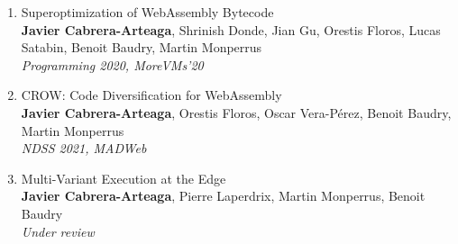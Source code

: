 \begin{enumerate}[label=\subscript{P}{{\arabic*}}]
    \item Superoptimization of WebAssembly Bytecode \cite{WasmSuperoptimizer}\\
    {\small\textbf{Javier Cabrera-Arteaga}, Shrinish Donde, Jian Gu, Orestis Floros, Lucas Satabin, Benoit Baudry, Martin Monperrus}\\
        \emph{Programming 2020, MoreVMs'20}
    \item CROW: Code Diversification for WebAssembly \cite{CROW}\\
    {\small\textbf{Javier Cabrera-Arteaga}, Orestis Floros, Oscar Vera-Pérez, Benoit Baudry, Martin Monperrus}\\
    \emph{NDSS 2021, MADWeb}
    \item Multi-Variant Execution at the Edge \cite{MEWE}\\
    {\small\textbf{Javier Cabrera-Arteaga}, Pierre Laperdrix, Martin Monperrus, Benoit Baudry}\\
    \emph{Under review}

\end{enumerate}
